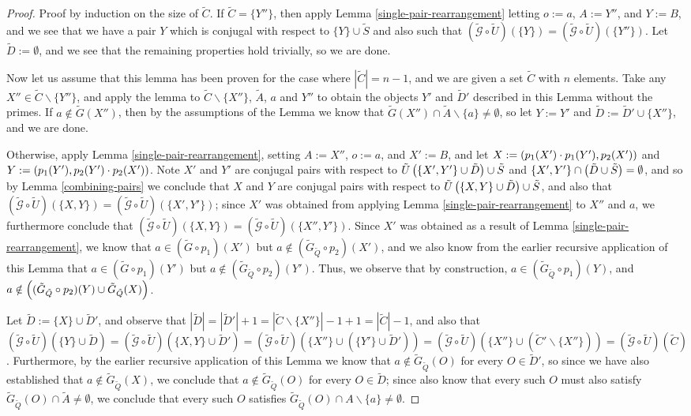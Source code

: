 \documentclass[twocolumn,showpacs,preprintnumbers,amsmath,amssymb,nofootinbib,pra,floatfix]{revtex4-1}
\newcommand{\set}{\tilde}
\newcommand{\genfun}{\tilde{\mathcal{G}}}
\begin{document}
\begin{proof}
Proof by induction on the size of $\set C$.  If $\set C=\{Y''\}$, then apply Lemma \ref{single-pair-rearrangement} letting $o:=a$, $A:=Y''$, and $Y:=B$, and we see that we have a pair $Y$ which is conjugal with respect to $\{Y\}\cup\set S$ and also such that $(\genfun\circ\set U)(\{Y\})=(\genfun\circ\set U)(\{Y''\})$.  Let $\set D:=\emptyset$, and we see that the remaining properties hold trivially, so we are done.

Now let us assume that this lemma has been proven for the case where $|\set C|=n-1$, and we are given a set $\set C$ with $n$ elements.  Take any $X''\in\set C\backslash\{Y''\}$, and apply the lemma to $\set C\backslash \{X''\}$, $\set A$, $a$ and $Y''$ to obtain the objects $Y'$ and $\set D'$ described in this Lemma without the primes.  If $a\notin\set G(X'')$, then by the assumptions of the Lemma we know that $\set G(X'') \cap \set A\backslash \{a\} \ne \emptyset$, so let $Y:=Y'$ and $\set D:=\set D'\cup\{X''\}$, and we are done.

Otherwise, apply Lemma \ref{single-pair-rearrangement}, setting $A:=X''$, $o:=a$, and $X':=B$, and let $X:=\left(p_1(X')\cdot p_1(Y'),p_2(X')\right)$ and $Y:=\left(p_1(Y'),p_2(Y')\cdot p_2(X')\right)$.  Note $X'$ and $Y'$ are conjugal pairs with respect to $\set U\paren{\{X',Y'\}\cup\set D}\cup\set S$ and $\{X',Y'\}\cap \paren{\set D\cup\set S}=\emptyset$, and so by Lemma \ref{combining-pairs} we conclude that $X$ and $Y$ are conjugal pairs with respect to $\set U\paren{\{X,Y\}\cup\set D}\cup\set S$, and also that $(\genfun\circ\set U)(\{X,Y\})=(\genfun\circ\set U)(\{X',Y'\})$;  since $X'$ was obtained from applying Lemma \ref{single-pair-rearrangement} to $X''$ and $a$, we furthermore conclude that $(\genfun\circ\set U)(\{X,Y\})=(\genfun\circ\set U)(\{X'',Y'\})$.  Since $X'$ was obtained as a result of Lemma \ref{single-pair-rearrangement}, we know that $a\in (\set G \circ p_1)(X')$ but $a\notin (\set G_{\set Q} \circ p_2)(X')$, and we also know from the earlier recursive application of this Lemma that $a\in (\set G \circ p_1)(Y')$ but $a\notin (\set G_{\set Q} \circ p_2)(Y')$.  Thus, we observe that by construction, $a\in (\set G_{\set Q} \circ p_1)(Y)$, and $a\notin \paren{(\set G_{\set Q} \circ p_2)(Y) \cup \set G_{\set Q}(X)}$.

Let $\set D:=\{X\}\cup\set D'$, and observe that $|\set D|=|\set D'|+1=|\set C\backslash \{X''\}|-1+1=|\set C|-1$, and also that $(\genfun\circ\set U)(\{Y\}\cup\set D)=(\genfun\circ\set U)(\{X,Y\}\cup\set D')=(\genfun\circ\set U)(\{X''\}\cup(\{Y'\}\cup\set D'))=(\genfun\circ\set U)(\{X''\}\cup(\set C'\backslash\{X''\}))=(\genfun\circ\set U)(\set C)$.  Furthermore, by the earlier recursive application of this Lemma we know that $a\notin\set G_{\set Q}(O)$ for every $O\in \set D'$, so since we have also established that $a\notin \set G_{\set Q}(X)$, we conclude that $a\notin\set G_{\set Q}(O)$ for every $O\in \set D$;  since also know that every such $O$ must also satisfy $\set G_{\set Q}(O)\cap \set A \ne \emptyset$, we conclude that every such $O$ satisfies $\set G_{\set Q}(O) \cap A\backslash\{a\}\ne\emptyset$.
\end{proof}
\end{document}
